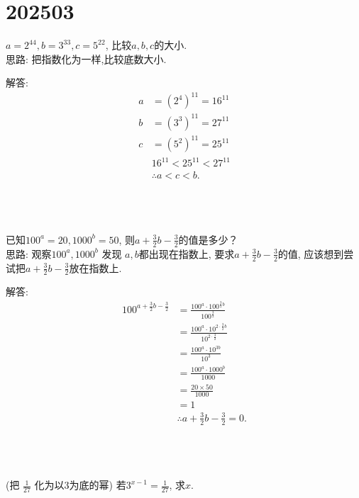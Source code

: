 \section{202503}

\item{
    $a=2^{44}, b=3^{33}, c=5^{22}$, 比较$a, b, c$的大小.
    \ifshowSolution
    \fangsong{}
    \\
    思路: 把指数化为一样,比较底数大小.

    解答: 
    \begin{align*}
        a &= (2^4)^{11} = 16^{11}\\
        b &= (3^3)^{11} = 27^{11}\\
        c &= (5^2)^{11} = 25^{11}\\
        & 16^{11} < 25^{11} < 27^{11}\\
        &\therefore a < c < b.
    \end{align*}
    \fi
    \unless\ifshowSolution
    \\ \\ \\
    \fi
}

\item{
    已知$100^a=20, 1000^b=50$, 则$a+\frac{3}{2}b-\frac{3}{2}$的值是多少？
    \ifshowSolution
    \fangsong{}
    \\
    思路: 观察$100^a, 1000^b$ 发现 $a,b$都出现在指数上, 要求$a+\frac{3}{2}b-\frac{3}{2}$的值, 应该想到尝试把$a+\frac{3}{2}b-\frac{3}{2}$放在指数上.

    解答: 
    \begin{align*}
        100^{a+\frac{3}{2}b-\frac{3}{2}} &= \frac{100^a\cdot 100^{\frac{3}{2}b}}{100^\frac{3}{2}}\\
        &= \frac{100^a\cdot 10^{2\cdot \frac{3}{2}b}}{10^{2\cdot\frac{3}{2}}}\\
        &= \frac{100^a\cdot 10^{3b}} {10^{3}}\\
        &= \frac{100^a\cdot 1000^{b}} {1000}\\
        &= \frac{20\times 50} {1000}\\
        &= 1\\
        &\therefore a+\frac{3}{2}b-\frac{3}{2} = 0.
    \end{align*}
    \fi
    \unless\ifshowSolution
    \\ \\ \\
    \fi
}

\item{
    (把 $\frac{1}{27}$ 化为以3为底的幂) 若$3^{x-1}=\frac{1}{27}$, 求$x$.
}
\\ \\ \\

